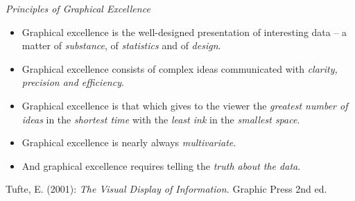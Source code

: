 \documentclass[
  10pt,
  ignorenonframetext,
]{beamer}
\providecommand{\tightlist}{%
  \setlength{\itemsep}{0pt}\setlength{\parskip}{0pt}}
\begin{document}
\begin{frame}{\emph{Principles of Graphical Excellence}}
\label{principles-of-graphical-excellence}
\begin{itemize}
\tightlist
\item
  Graphical excellence is the well-designed presentation of interesting
  data -- a matter of \emph{substance}, of \emph{statistics} and of
  \emph{design}.
\item
  Graphical excellence consists of complex ideas communicated with
  \emph{clarity, precision and efficiency}.
\item
  Graphical excellence is that which gives to the viewer the
  \emph{greatest number of ideas} in the \emph{shortest time} with the
  \emph{least ink} in the \emph{smallest space}.
\item
  Graphical excellence is nearly always \emph{multivariate}.
\item
  And graphical excellence requires telling the \emph{truth about the
  data}.
\end{itemize}

\scriptsize

Tufte, E. (2001): \emph{The Visual Display of Information.} Graphic
Press 2nd ed.
\end{frame}
\end{document}
